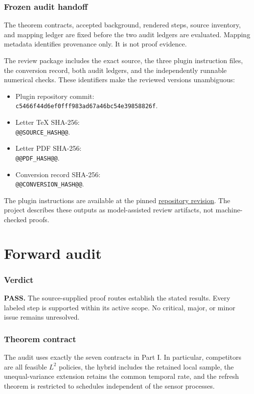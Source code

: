 \documentclass[11pt,letterpaper]{article}
\begin{document}
\clearpage
\section{Frozen audit handoff}
The theorem contracts, accepted background, rendered steps, source inventory, and mapping ledger are fixed before the two audit ledgers are evaluated. Mapping metadata identifies provenance only. It is not proof evidence.

The review package includes the exact source, the three plugin instruction files, the conversion record, both audit ledgers, and the independently runnable numerical checks. These identifiers make the reviewed versions unambiguous:

\begin{itemize}
\item Plugin repository commit:\\ \nolinkurl{c5466f44d6ef0fff983ad67a46bc54e39858826f}.
\item Letter TeX SHA-256:\\ \nolinkurl{@@SOURCE_HASH@@}.
\item Letter PDF SHA-256:\\ \nolinkurl{@@PDF_HASH@@}.
\item Conversion record SHA-256:\\ \nolinkurl{@@CONVERSION_HASH@@}.
\end{itemize}
The plugin instructions are available at the pinned \href{https://github.com/WWresearch/lamport-proof/tree/c5466f44d6ef0fff983ad67a46bc54e39858826f/skills}{repository revision}. The project describes these outputs as model-assisted review artifacts, not machine-checked proofs.

\clearpage
\part{Forward audit}
\section{Verdict}
\textbf{PASS.} The source-supplied proof routes establish the stated results. Every labeled step is supported within its active scope. No critical, major, or minor issue remains unresolved.

\section{Theorem contract}
The audit uses exactly the seven contracts in Part I. In particular, competitors are all feasible $L^2$ policies, the hybrid includes the retained local sample, the unequal-variance extension retains the common temporal rate, and the refresh theorem is restricted to schedules independent of the sensor processes.
\end{document}
